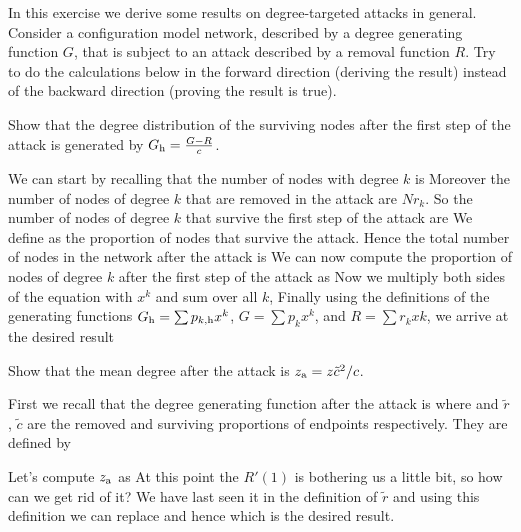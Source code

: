 
In this exercise we derive some results on degree-targeted attacks in general. Consider a configuration model network, described by a degree generating function $G$, that is subject to an attack described by a removal function $R$. Try to do the calculations below in the forward direction (deriving the result) instead of the backward direction (proving the result is true).

\subquestion Show that the degree distribution of the surviving nodes after the first step of the attack is generated by $G_{\rm h}=\frac{G-R}{c}$.

\solution
We can start by recalling that the number of nodes with degree $k$ is 
Moreover the number of nodes of degree $k$ that are removed in the attack are $N r_k$. So the number of nodes of degree $k$ that survive the first step of the attack are
We define 
as the proportion of nodes that survive the attack. Hence the total number of nodes in the network after the attack is 
We can now compute the proportion of nodes of degree $k$ after the first step of the attack as 
Now we multiply both sides of the equation with $x^k$ and sum over all $k$,
Finally using the definitions of the generating functions $G_{\rm h} = \sum p_{k,{\rm h}} x^k $, $G=\sum p_k x^k$, and $R=\sum r_k xk$, we arrive at the desired result

\subquestion Show that the mean degree after the attack is $z_{\rm a}=z\tilde{c}^2/c$.

\solution 
First we recall that the degree generating function after the attack is 
where 
and $\tilde{r}$, $\tilde{c}$ are the removed and surviving proportions of endpoints respectively. They are defined by  

Let's compute $z_{\rm a}$ as 
At this point the $R'(1)$ is bothering us a little bit, so how can we get rid of it? We have last seen it in the definition of $\tilde{r}$ and using this definition we can replace 
and hence 
which is the desired result. 

